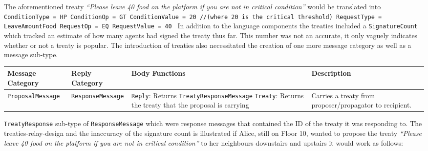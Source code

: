 \documentclass{article}
\begin{document}
\vspace{\baselineskip}
The aforementioned treaty \textit{“Please leave 40 food on the platform if you are not in critical condition”} would be translated into \newline
\texttt{ConditionType = HP \newline
        ConditionOp = GT \newline
        ConditionValue = 20 //(where 20 is the critical threshold) \newline
        RequestType = LeaveAmountFood \newline
        RequestOp = EQ \newline
        RequestValue = 40 \newline}
In addition to the language components the treaties included a \texttt{SignatureCount} which tracked an estimate of how many agents had signed the treaty thus far. This number was not an accurate, it only vaguely indicates whether or not a treaty is popular. 
The introduction of treaties also necessitated the creation of one more message category as well as a message sub-type. 
\begin{center}
\begin{tabular}{p{3cm}p{3cm}p{5cm}p{3.5cm}}
 \hline
 \textbf{Message \newline Category} & \textbf{Reply \newline Category} & \textbf{Body Functions} & \textbf{Description} \\ [0.5ex] 
 \hline\hline
 \texttt{ProposalMessage} & \texttt{ResponseMessage} &  
 \texttt{Reply}: Returns \texttt{TreatyResponseMessage} \newline 
 \texttt{Treaty}: Returns the treaty that the proposal is carrying &
 Carries a treaty from proposer/propagator to recipient.\\
 \hline
\end{tabular}
\end{center}
\texttt{TreatyResponse} sub-type of \texttt{ResponseMessage} which were response messages that contained the ID of the treaty it was responding to. \newline
The treaties-relay-design and the inaccuracy of the signature count is illustrated if Alice, still on Floor 10, wanted to propose the treaty \textit{“Please leave 40 food on the platform if you are not in critical condition”} to her neighbours downstairs and upstairs it would work as follows:
\end{document}
